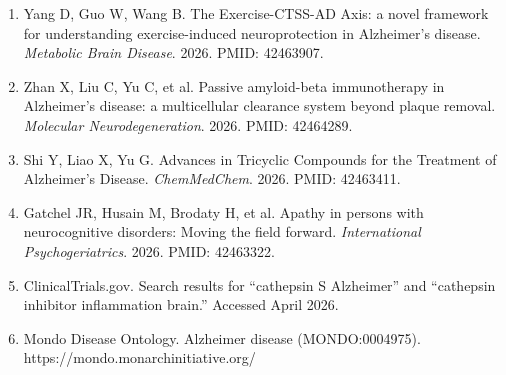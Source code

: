 \documentclass[11pt, a4paper]{article}
\begin{document}
\begin{enumerate}
    \item Yang D, Guo W, Wang B. The Exercise-CTSS-AD Axis: a novel framework for understanding exercise-induced neuroprotection in Alzheimer's disease. \textit{Metabolic Brain Disease}. 2026. PMID: 42463907.
    \item Zhan X, Liu C, Yu C, et al. Passive amyloid-beta immunotherapy in Alzheimer's disease: a multicellular clearance system beyond plaque removal. \textit{Molecular Neurodegeneration}. 2026. PMID: 42464289.
    \item Shi Y, Liao X, Yu G. Advances in Tricyclic Compounds for the Treatment of Alzheimer's Disease. \textit{ChemMedChem}. 2026. PMID: 42463411.
    \item Gatchel JR, Husain M, Brodaty H, et al. Apathy in persons with neurocognitive disorders: Moving the field forward. \textit{International Psychogeriatrics}. 2026. PMID: 42463322.
    \item ClinicalTrials.gov. Search results for ``cathepsin S Alzheimer'' and ``cathepsin inhibitor inflammation brain.'' Accessed April 2026.
    \item Mondo Disease Ontology. Alzheimer disease (MONDO:0004975). https://mondo.monarchinitiative.org/
\end{enumerate}
\end{document}

